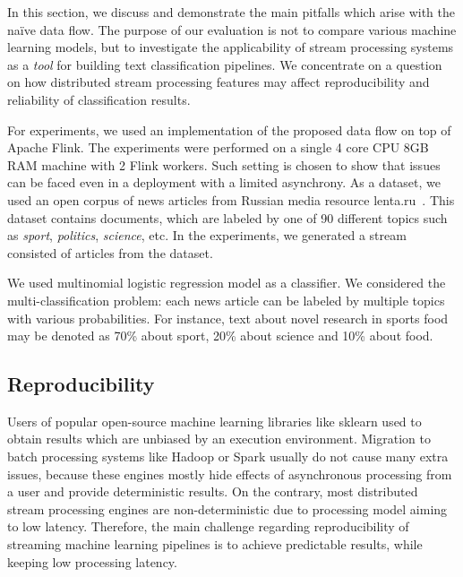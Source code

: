 \label {fs-discussion}

In this section, we discuss and demonstrate the main pitfalls which arise with the na\"ive data flow. The purpose of our evaluation is not to compare various machine learning models, but to investigate the applicability of stream processing systems as a {\em tool} for building text classification pipelines. We concentrate on a question on how distributed stream processing features may affect reproducibility and reliability of classification results.

For experiments, we used an implementation of the proposed data flow on top of Apache Flink. The experiments were performed on a single 4 core CPU 8GB RAM machine with 2 Flink workers. Such setting is chosen to show that issues can be faced even in a deployment with a limited asynchrony. As a dataset, we used an open corpus of news articles from Russian media resource lenta.ru~\cite{lentaru}. This dataset contains documents, which are labeled by one of 90 different topics such as {\em sport}, {\em politics}, {\em science}, etc. In the experiments, we generated a stream consisted of articles from the dataset.

We used multinomial logistic regression model as a classifier. We considered the multi-classification problem: each news article can be labeled by multiple topics with various probabilities. For instance, text about novel research in sports food may be denoted as 70\% about sport, 20\% about science and 10\% about food. 

\subsection{Reproducibility}

Users of popular open-source machine learning libraries like sklearn used to obtain results which are unbiased by an execution environment. Migration to batch processing systems like Hadoop or Spark usually do not cause many extra issues, because these engines mostly hide effects of asynchronous processing from a user and provide deterministic results. On the contrary, most distributed stream processing engines are non-deterministic due to processing model aiming to low latency. Therefore, the main challenge regarding reproducibility of streaming machine learning pipelines is to achieve predictable results, while keeping low processing latency. 

